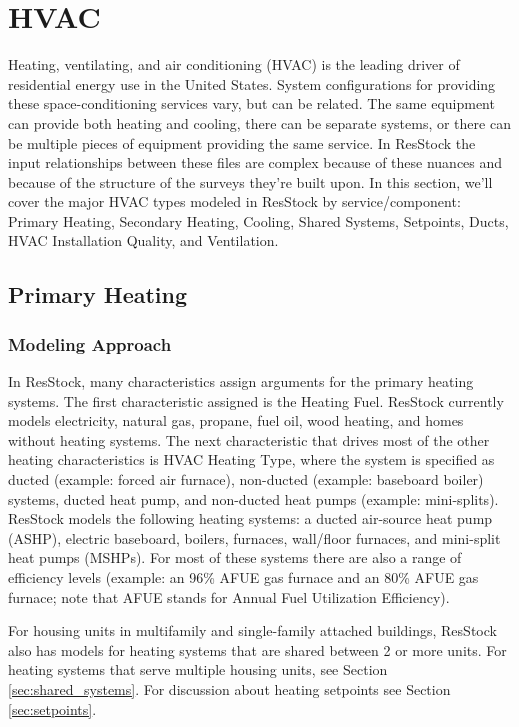\section{HVAC}
Heating, ventilating, and air conditioning (HVAC) is the leading driver of residential energy use in the United States. System configurations for providing these space-conditioning services vary, but can be related. The same equipment can provide both heating and cooling, there can be separate systems, or there can be multiple pieces of equipment providing the same service. In ResStock the input relationships between these files are complex because of these nuances and because of the structure of the surveys they're built upon. In this section, we'll cover the major HVAC types modeled in ResStock by service/component: Primary Heating, Secondary Heating, Cooling, Shared Systems, Setpoints, Ducts, HVAC Installation Quality, and Ventilation.
\subsection{Primary Heating}
\subsubsection{Modeling Approach}
In ResStock, many characteristics assign arguments for the primary heating systems. The first characteristic assigned is the Heating Fuel. ResStock currently models electricity, natural gas, propane, fuel oil, wood heating, and homes without heating systems. The next characteristic that drives most of the other heating characteristics is HVAC Heating Type, where the system is specified as ducted (example: forced air furnace), non-ducted (example: baseboard boiler) systems, ducted heat pump, and non-ducted heat pumps (example: mini-splits). ResStock models the following heating systems: a ducted air-source heat pump (ASHP), electric baseboard, boilers, furnaces, wall/floor furnaces, and mini-split heat pumps (MSHPs). For most of these systems there are also a range of efficiency levels (example: an 96\% AFUE gas furnace and an 80\% AFUE gas furnace; note that AFUE stands for Annual Fuel Utilization Efficiency).

For housing units in multifamily and single-family attached buildings, ResStock also has models for heating systems that are shared between 2 or more units. For heating systems that serve multiple housing units, see Section \ref{sec:shared_systems}. For discussion about heating setpoints see Section \ref{sec:setpoints}.

